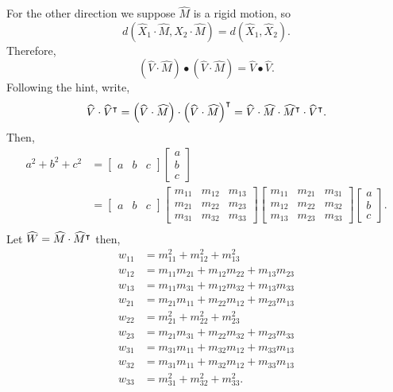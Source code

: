 \documentclass{ximera}
\begin{document}
\begin{problem}
\begin{freeResponse}
For the other direction we suppose $\hat{M}$ is a rigid motion, so
\[
 d\left( \hat{X}_{1}  \cdot\hat{M},\hat{X}_{2}
   \cdot\hat{M}\right) = d\left(  \hat{X}_{1},\hat{X}_{2}\right).
\]
Therefore, 
\[
	\left(  \hat{V}  \cdot\hat{M} \right) \bullet\left(
    \hat{V}  \cdot\hat{M}\right)  =\hat{V}\bullet\hat{V}.
 \]
Following the hint, write,
\[
\widehat{V}\cdot\widehat{V}^\intercal= \left(  \widehat{V}  \cdot\widehat{M} \right) \cdot\left(
    \widehat{V}  \cdot\widehat{M}\right)^\intercal  = \widehat{V} \cdot\widehat{M} \cdot \widehat{M}^\intercal \cdot \widehat{V}^\intercal .
\]
Then, 
\begin{align*}
a^2 + b^2 +c^2 &= 
\begin{bmatrix}
      a & b & c
    \end{bmatrix}
\begin{bmatrix}
      a \\
      b \\
      c
    \end{bmatrix} \\ &=
\begin{bmatrix}
      a & b & c
    \end{bmatrix}
\begin{bmatrix}
	m_{11} & m_{12} & m_{13}\\
	m_{21} & m_{22} & m_{23}\\
	m_{31} & m_{32} & m_{33}
\end{bmatrix}
\begin{bmatrix}
	m_{11} & m_{21} & m_{31}\\
	m_{12} & m_{22} & m_{32}\\
	m_{13} & m_{23} & m_{33}
\end{bmatrix}
\begin{bmatrix}
      a \\
      b \\
      c
    \end{bmatrix}. \\
 \end{align*}
 Let $\widehat{W} = \widehat{M} \cdot \widehat{M}^\intercal$ then,
 \begin{align*}
 w_{11} &= m_{11}^2 + m_{12}^2 +  m_{13}^2 \\
 w_{12} &= m_{11}m_{21} + m_{12}m_{22} +m_{13}m_{23}\\
 w_{13} &= m_{11}m_{31} + m_{12}m_{32} +m_{13}m_{33}\\
 w_{21} &= m_{21}m_{11} + m_{22}m_{12} +m_{23}m_{13} \\
 w_{22} &= m_{21}^2 + m_{22}^2 +  m_{23}^2 \\
 w_{23} &=  m_{21}m_{31} + m_{22}m_{32} +m_{23}m_{33} \\
 w_{31} &= m_{31}m_{11} + m_{32}m_{12} +m_{33}m_{13} \\
 w_{32} &= m_{31}m_{11} + m_{32}m_{12} +m_{33}m_{13}\\
 w_{33} &= m_{31}^2 + m_{32}^2 +  m_{33}^2.
 \end{align*}    
   

\end{freeResponse}
\end{problem}
\end{document}

